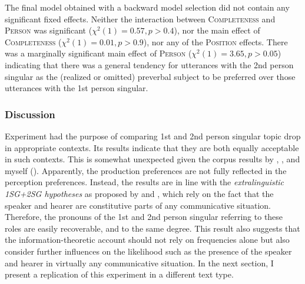 The final model obtained with a backward model selection did not contain any significant fixed effects.
Neither the interaction between \textsc{Completeness} and \textsc{Person} was significant ($\chi^2(1) = 0.57, p > 0.4$), nor the main effect of \textsc{Completeness} ($\chi^2 (1) = 0.01, p > 0.9$), nor any of the \textsc{Position} effects.
There was a marginally significant main effect of \textsc{Person} ($\chi^2(1) = 3.65, p > 0.05$) indicating that there was a general tendency for utterances with the 2nd person singular as the (realized or omitted) preverbal subject to be preferred over those utterances with the 1st person singular.

\subsubsection{Discussion}
Experiment  had the purpose of comparing 1st and 2nd person singular topic drop in appropriate contexts.
Its results indicate that they are both equally acceptable in such contexts.
This is somewhat unexpected given the corpus results by \citet{androutsopoulos.schmidt2002}, \citet{frick2017}, and myself ().
Apparently, the production preferences are not fully reflected in the perception preferences.
Instead, the results are in line with the \textit{extralinguistic 1SG+2SG hypotheses} as proposed by \citet{zifonun.etal1997} and \citet{ariel1990}, which rely on the fact that the speaker and hearer are constitutive parts of any communicative situation.
Therefore, the pronouns of the 1st and 2nd person singular referring to these roles are easily recoverable, and to the same degree.
This result also suggests that the information-theoretic account should not rely on frequencies alone but also consider further influences on the likelihood such as the presence of the speaker and hearer in virtually any communicative situation.
In the next section, I present a replication of this experiment in a different text type. 

\label{exp:1sg.2sg.spoken}
